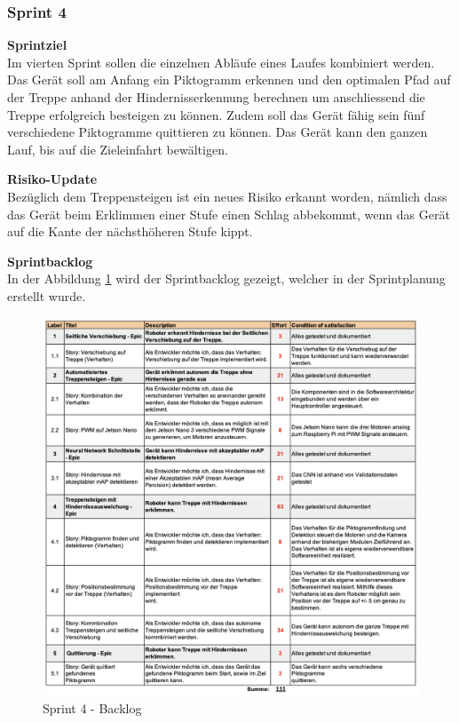 \subsubsection{Sprint 4}
\textbf{Sprintziel}\\
Im vierten Sprint sollen die einzelnen Abläufe eines Laufes kombiniert werden. Das Gerät soll am Anfang ein Piktogramm erkennen und den optimalen Pfad auf der Treppe anhand der Hindernisserkennung berechnen um anschliessend die Treppe erfolgreich besteigen zu können. Zudem soll das Gerät fähig sein fünf verschiedene Piktogramme quittieren zu können. Das Gerät kann den ganzen Lauf, bis auf die Zieleinfahrt bewältigen.

\textbf{Risiko-Update}\\
Bezüglich dem Treppensteigen ist ein neues Risiko erkannt worden, nämlich dass das Gerät beim Erklimmen einer Stufe einen Schlag abbekommt, wenn das Gerät auf die Kante der nächsthöheren Stufe kippt.

\textbf{Sprintbacklog}\\
In der Abbildung \ref{fig:sprint-backlog-4} wird der Sprintbacklog gezeigt, welcher in der Sprintplanung erstellt wurde.
\begin{figure}[H]
  \includegraphics[width=1.0\textwidth]{img/projektmanagement/Sprint 4.png}
  \centering
  \caption{Sprint 4 - Backlog}
  \label{fig:sprint-backlog-4}
\end{figure}

